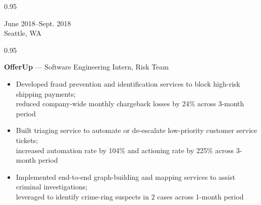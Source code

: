 \documentclass[a4paper,9pt]{article}
\newcommand{\mainMarginBottom}{\vspace*{2.5pt}}
\newcommand{\newLine}{\\}
\newcommand{\doubleColumnGap}{\hspace{4mm}}
\newcommand{\withinSectionMarginBetween}{\vspace{-2.75ex}}
\newcommand{\mainLineSpacing}{0.95}
\begin{document}
\begin{minipage}[t]{0.20\linewidth}
  \begin{small}
    \begin{spacing}\mainLineSpacing{}
      \begin{flushright}
        June 2018--Sept. 2018
        \newLine{}
        \mainMarginBottom{}
        Seattle, WA
      \end{flushright}
    \end{spacing}
  \end{small}
\end{minipage}
\doubleColumnGap{}
\begin{minipage}[t]{0.75\linewidth}
  \begin{small}
    \begin{spacing}\mainLineSpacing{}
      \begin{flushleft}
        \textbf{OfferUp} --- Software Engineering Intern, Risk Team
        \mainMarginBottom{}
        \begin{itemize}[itemsep=1pt,topsep=0pt,leftmargin=*]
          \item Developed fraud prevention and identification services to block high-risk shipping payments;\\ reduced company-wide monthly chargeback losses by 24\% across 3-month period
          \item Built triaging service to automate or de-escalate low-priority customer service tickets;\\ increased automation rate by 104\% and actioning rate by 225\% across 3-month period
          \item Implemented end-to-end graph-building and mapping services to assist criminal investigations;\\ leveraged to identify crime-ring suspects in 2 cases across 1-month period
        \end{itemize}
      \end{flushleft}
    \end{spacing}
  \end{small}
\end{minipage}

\withinSectionMarginBetween{}
\end{document}
